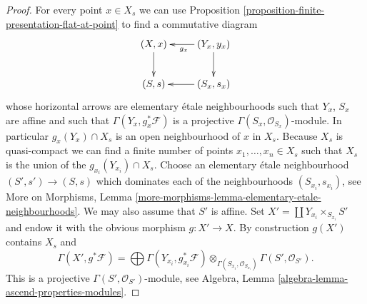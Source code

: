 \documentclass[10pt,a4paper]{amsart}
\theoremstyle{plain}
\theoremstyle{definition}
\theoremstyle{remark}
\numberwithin{equation}{subsection}
\begin{document}
\begin{proof}
For every point $x \in X_s$ we can use
Proposition \ref{proposition-finite-presentation-flat-at-point}
to find a commutative diagram
$$
\xymatrix{
(X, x) \ar[d] & (Y_x, y_x) \ar[l]^{g_x} \ar[d] \\
(S, s) & (S_x, s_x) \ar[l]
}
$$
whose horizontal arrows are elementary \'etale neighbourhoods
such that $Y_x$, $S_x$ are affine and such that
$\Gamma(Y_x, g_x^*\mathcal{F})$ is a projective
$\Gamma(S_x, \mathcal{O}_{S_x})$-module. In particular
$g_x(Y_x) \cap X_s$ is an open neighbourhood of $x$ in $X_s$.
Because $X_s$ is quasi-compact we can find a finite number of points
$x_1, \ldots, x_n \in X_s$ such that $X_s$ is the union of
the $g_{x_i}(Y_{x_i}) \cap X_s$. Choose an elementary \'etale neighbourhood
$(S' , s') \to (S, s)$ which dominates each of the neighbourhoods
$(S_{x_i}, s_{x_i})$, see
More on Morphisms,
Lemma \ref{more-morphisms-lemma-elementary-etale-neighbourhoods}.
We may also assume that $S'$ is affine.
Set $X' = \coprod Y_{x_i} \times_{S_{x_i}} S'$ and endow it with the
obvious morphism $g : X' \to X$.
By construction $g(X')$ contains $X_s$ and
$$
\Gamma(X', g^*\mathcal{F})
=
\bigoplus \Gamma(Y_{x_i}, g_{x_i}^*\mathcal{F})
\otimes_{\Gamma(S_{x_i}, \mathcal{O}_{S_{x_i}})}
\Gamma(S', \mathcal{O}_{S'}).
$$
This is a projective $\Gamma(S', \mathcal{O}_{S'})$-module, see
Algebra, Lemma \ref{algebra-lemma-ascend-properties-modules}.
\end{proof}
\end{document}
